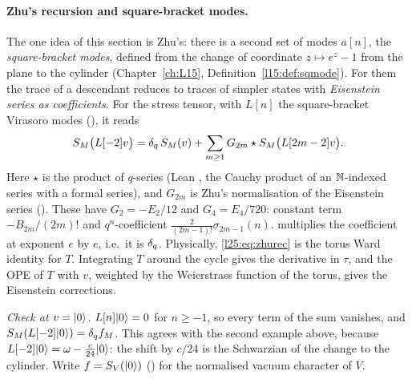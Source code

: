 \paragraph{Zhu's recursion and square-bracket modes.} The one idea of this section is Zhu's: there is a second set of
modes $a[n]$, the \emph{square-bracket modes}, defined from the change of coordinate $z\mapsto e^z-1$ from the plane to
the cylinder (Chapter~\ref{ch:L15}, Definition~\ref{l15:def:sqmode}). For them the trace of a descendant reduces to
traces of simpler states with \emph{Eisenstein series as coefficients}. For the stress tensor, with $L[n]$ the
square-bracket Virasoro modes (), it reads
\begin{equation}\label{l25:eq:zhurec}
S_M\big(L[-2]v\big)=\delta_q\,S_M(v)+\sum_{m\ge1}G_{2m}\star S_M\big(L[2m-2]v\big).
\end{equation}
Here $\star$ is the product of $q$-series (Lean , the Cauchy product of an ${\mathbb{N}}$-indexed series with a
formal series), and $G_{2m}$ is Zhu's normalisation of the Eisenstein series (). These have
$G_2=-E_2/12$ and $G_4=E_4/720$: constant term $-B_{2m}/(2m)!$ and $q^n$-coefficient $\frac{2}{(2m-1)!}\sigma_{2m-1}(n)$.
 multiplies the coefficient at exponent $e$ by $e$, i.e.\ it is $\delta_q$. Physically,
\eqref{l25:eq:zhurec} is the torus Ward identity for $T$. Integrating $T$ around the cycle gives the derivative in
$\tau$, and the OPE of $T$ with $v$, weighted by the Weierstrass function of the torus, gives the Eisenstein
corrections.

\emph{Check at $v=|0\rangle$.} $L[n]|0\rangle=0$ for $n\ge-1$, so every term of the sum vanishes, and
$S_M(L[-2]|0\rangle)=\delta_q f_M$. This agrees with the second example above, because
$L[-2]|0\rangle=\omega-\frac c{24}|0\rangle$: the shift by $c/24$ is the Schwarzian of the change to the
cylinder. Write $f=S_V(|0\rangle)$ () for the normalised vacuum character of $V$.

